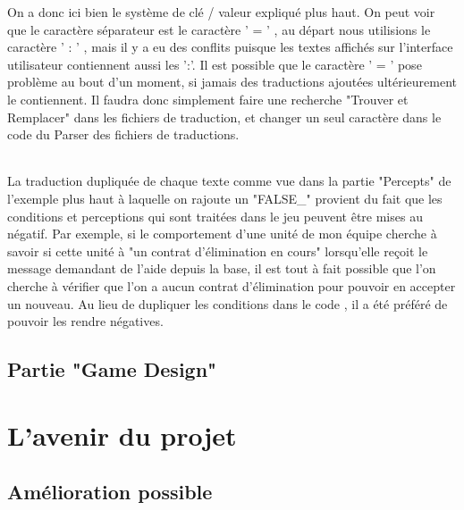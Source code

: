 \documentclass{report}
\begin{document}
On a donc ici bien le système de clé / valeur expliqué plus haut. 
On peut voir que le caractère séparateur est le caractère ' = ' , au départ nous utilisions le caractère ' : ' , mais il y a eu des conflits puisque les textes affichés sur l'interface utilisateur contiennent aussi les ':'.
Il est possible que le caractère ' = ' pose problème au bout d'un moment, si jamais des traductions ajoutées ultérieurement le contiennent. Il faudra donc simplement faire une recherche "Trouver et Remplacer" dans les fichiers de traduction, et changer un seul caractère dans le code du Parser des fichiers de traductions. 

\paragraph{}

La traduction dupliquée de chaque texte comme vue dans la partie "Percepts" de l'exemple plus haut à laquelle on rajoute un "FALSE_" provient du fait que les conditions et perceptions qui sont traitées dans le jeu peuvent être mises au négatif. Par exemple, si le comportement d'une unité de mon équipe cherche à savoir si cette unité à "un contrat d'élimination en cours" lorsqu'elle reçoit le message demandant de l'aide depuis la base, il est tout à fait possible que l'on cherche à vérifier que l'on a aucun contrat d'élimination pour pouvoir en accepter un nouveau.
Au lieu de dupliquer les conditions dans le code , il a été préféré de pouvoir les rendre négatives.


\newpage
\chapter{Partie "Game Design"}

\newpage
\part{L'avenir du projet}
\chapter{Amélioration possible}

%
%
\end{document}
